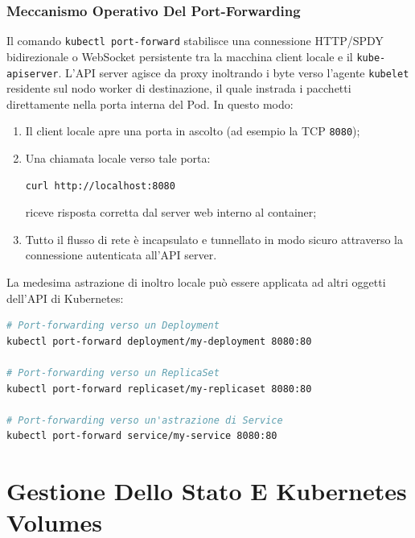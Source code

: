 \documentclass[11pt, a4paper]{article}
\begin{document}
\subsubsection{Meccanismo Operativo Del Port-Forwarding}
Il comando \texttt{kubectl port-forward} stabilisce una connessione HTTP/SPDY bidirezionale o WebSocket persistente tra la macchina client locale e il \texttt{kube-apiserver}. L'API server agisce da proxy inoltrando i byte verso l'agente \texttt{kubelet} residente sul nodo worker di destinazione, il quale instrada i pacchetti direttamente nella porta interna del Pod. In questo modo:
\begin{enumerate}[noitemsep]
    \item Il client locale apre una porta in ascolto (ad esempio la TCP \texttt{8080});
    \item Una chiamata locale verso tale porta:
    \begin{lstlisting}[language=bash]
curl http://localhost:8080
    \end{lstlisting}
    riceve risposta corretta dal server web interno al container;
    \item Tutto il flusso di rete è incapsulato e tunnellato in modo sicuro attraverso la connessione autenticata all'API server.
\end{enumerate}

La medesima astrazione di inoltro locale può essere applicata ad altri oggetti dell'API di Kubernetes:
\begin{lstlisting}[language=bash, caption={Esempi di port-forwarding su risorse di livello superiore.}]
# Port-forwarding verso un Deployment
kubectl port-forward deployment/my-deployment 8080:80

# Port-forwarding verso un ReplicaSet
kubectl port-forward replicaset/my-replicaset 8080:80

# Port-forwarding verso un'astrazione di Service
kubectl port-forward service/my-service 8080:80
\end{lstlisting}

\newpage


\section{Gestione Dello Stato E Kubernetes Volumes}
\end{document}
